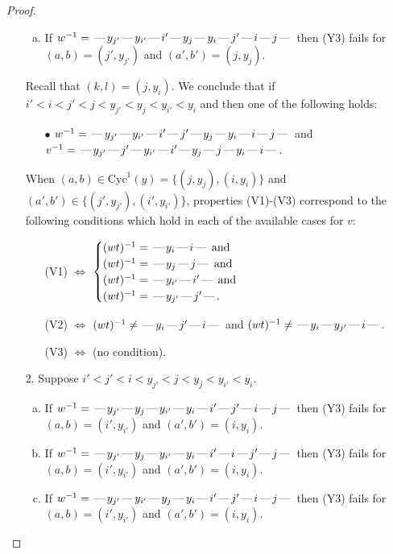 \documentclass[10pt]{article}
\theoremstyle{definition}
\theoremstyle{definition}
\def\dash{\text{\hspace{0.5mm}---\hspace{0.5mm}}}
\def\Cyc{\mathrm{Cyc}}
\begin{document}
\begin{proof}
\begin{enumerate}
\begin{enumerate}[(a)]
\item If $w^{-1} = \dash y_{j'}\dash y_{i'}\dash i'\dash y_j\dash y_i\dash j'\dash i\dash j\dash $ then (Y3) fails for $(a,b)=(j',y_{j'})$ and $(a',b')=(j,y_j)$.
\end{enumerate}
Recall that $(k,l) = (j,y_i)$.
We conclude that if $i' < i < j' < j < y_{j'} < y_j < y_{i'} < y_i$ and then one of the following holds:
\begin{enumerate}
\item[$\bullet$] $w^{-1} = \dash y_{j'}\dash y_{i'}\dash i'\dash j'\dash y_j\dash y_i\dash i\dash j\dash $ and $v^{-1} = \dash y_{j'}\dash j'\dash y_{i'}\dash i'\dash y_j\dash j\dash y_i\dash i\dash $.
\end{enumerate}
When $(a,b)\in\Cyc^1(y)=\{(j,y_j),(i,y_i)\}$ and $(a',b')\in\{(j',y_{j'}),(i',y_{i'})\}$,
properties (V1)-(V3) correspond to the following conditions which hold in
each of the available cases for $v$:
\begin{enumerate}
\item[](V1) $\Leftrightarrow$ $\begin{cases}\text{$(wt)^{-1} = \dash y_i \dash i \dash$}\text{ and }\\
\text{$(wt)^{-1} = \dash y_j \dash j \dash$}\text{ and }\\
\text{$(wt)^{-1} = \dash y_{i'} \dash i' \dash$}\text{ and }\\
\text{$(wt)^{-1} = \dash y_{j'} \dash j' \dash$}.\end{cases}$
\item[](V2) $\Leftrightarrow$ $(wt)^{-1} \neq \dash y_i \dash j' \dash i \dash$ and $(wt)^{-1}\neq \dash y_i \dash y_{j'} \dash i \dash$.
\item[](V3) $\Leftrightarrow$ (no condition).
\end{enumerate}
\item[$2$.] Suppose $i' < j' < i < y_{j'} < j < y_j < y_{i'} < y_i$.
\begin{enumerate}[(a)]
\item If $w^{-1} = \dash y_{j'}\dash y_j\dash y_{i'}\dash y_i\dash i'\dash j'\dash i\dash j\dash $ then (Y3) fails for $(a,b)=(i',y_{i'})$ and $(a',b')=(i,y_i)$.
\item If $w^{-1} = \dash y_{j'}\dash y_j\dash y_{i'}\dash y_i\dash i'\dash i\dash j'\dash j\dash $ then (Y3) fails for $(a,b)=(i',y_{i'})$ and $(a',b')=(i,y_i)$.
\item If $w^{-1} = \dash y_{j'}\dash y_{i'}\dash y_j\dash y_i\dash i'\dash j'\dash i\dash j\dash $ then (Y3) fails for $(a,b)=(i',y_{i'})$ and $(a',b')=(i,y_i)$.

\end{enumerate}
\end{enumerate}
\end{proof}
\end{document}

